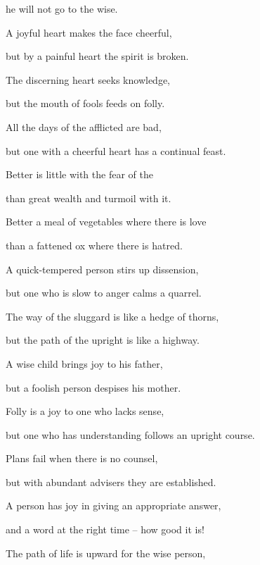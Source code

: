 {\par }{\Q he will not
go
to
the wise.
\par }{\Q {}A joyful
heart
makes the face
cheerful,
\par }{\Q but by a painful
heart
the spirit
is broken.
\par }{\Q {}The discerning
heart
seeks
knowledge,
\par }{\Q but the mouth of fools
feeds
on folly.
\par }{\Q {}All
the days
of the afflicted
are bad,
\par }{\Q but one with a cheerful
heart
has a continual
feast.
\par }{\Q {}Better
is little
with the fear
of the {}
\par }{\Q than great
wealth
and turmoil with it.
\par }{\Q {}Better
a meal
of vegetables
where there is love
\par }{\Q than a fattened
ox
where there
is hatred.
\par }{\Q {}A quick-tempered
person
stirs up
dissension,
\par }{\Q but one who is slow
to anger
calms
a quarrel.
\par }{\Q {}The way
of the sluggard
is like a hedge
of thorns,
\par }{\Q but the path
of the upright
is like a highway.
\par }{\Q {}A wise
child
brings joy
to his father,
\par }{\Q but a foolish
person
despises
his mother.
\par }{\Q {}Folly
is a joy
to one who lacks
sense,
\par }{\Q but one
who has understanding
follows
an upright course.
\par }{\Q {}Plans
fail
when there is no
counsel,
\par }{\Q but with abundant
advisers
they are established.
\par }{\Q {}A person has joy
in giving an appropriate answer,
\par }{\Q and a word
at the right time –
how
good it is!
\par }{\Q {}The path
of life
is upward
for the wise
person,

}
